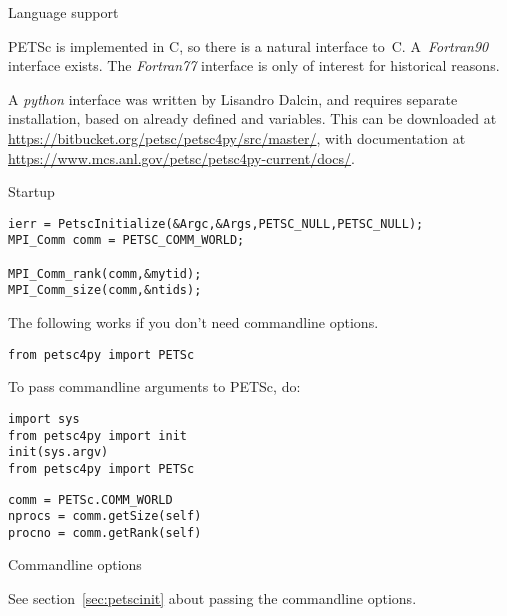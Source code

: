 
 {Language support}

PETSc is implemented in C, so there is a natural interface
to~C. A~\emph{Fortran90}
interface exists. The \emph{Fortran77}
interface is only of
interest for historical reasons.

A \emph{python} interface was written by
Lisandro Dalcin, and requires separate installation, based on already
defined  and 
variables.  This can be downloaded at
\url{https://bitbucket.org/petsc/petsc4py/src/master/}, with
documentation at
\url{https://www.mcs.anl.gov/petsc/petsc4py-current/docs/}.

 {Startup}
\label{sec:petscinit}

\begin{verbatim}
ierr = PetscInitialize(&Argc,&Args,PETSC_NULL,PETSC_NULL);
MPI_Comm comm = PETSC_COMM_WORLD;

MPI_Comm_rank(comm,&mytid);
MPI_Comm_size(comm,&ntids);
\end{verbatim}

\begin{pythonnote}
  The following works if you don't need commandline options.
\begin{verbatim}
from petsc4py import PETSc
\end{verbatim}
To pass commandline arguments to PETSc, do:
\begin{verbatim}
import sys
from petsc4py import init
init(sys.argv)
from petsc4py import PETSc
\end{verbatim}
\end{pythonnote}

\begin{verbatim}
comm = PETSc.COMM_WORLD
nprocs = comm.getSize(self) 
procno = comm.getRank(self)
\end{verbatim}

 {Commandline options}

See section~\ref{sec:petscinit} about passing the commandline options.

